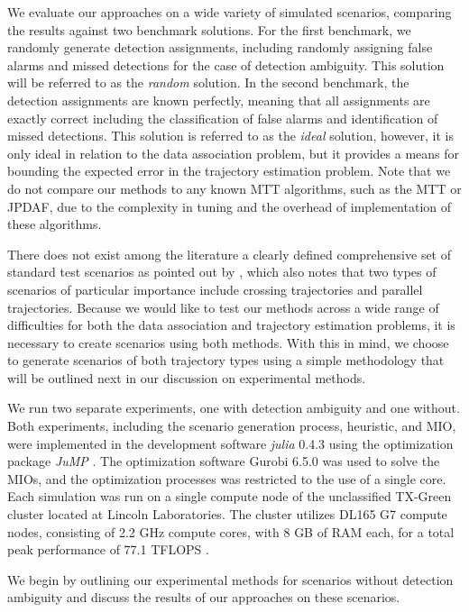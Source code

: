 We evaluate our approaches on a wide variety of simulated scenarios, comparing the results against two benchmark solutions. For the first benchmark, we randomly generate detection assignments, including randomly assigning false alarms and missed detections for the case of detection ambiguity. This solution will be referred to as the \textit{random} solution. In the second benchmark, the detection assignments are known perfectly, meaning that all assignments are exactly correct including the classification of false alarms and identification of missed detections. This solution is referred to as the \textit{ideal} solution, however, it is only ideal in relation to the data association problem, but it provides a means for bounding the expected error in the trajectory estimation problem. Note that we do not compare our methods to any known MTT algorithms, such as the MTT or JPDAF, due to the complexity in tuning and the overhead of implementation of these algorithms. 

There does not exist among the literature a clearly defined comprehensive set of standard test scenarios as pointed out by \cite{MTT-Taxonomy}, which also notes that two types of scenarios of particular importance include crossing trajectories and parallel trajectories. Because we would like to test our methods across a wide range of difficulties for both the data association and trajectory estimation problems, it is necessary to create scenarios using both methods. With this in mind, we choose to generate scenarios of both trajectory types using a simple methodology that will be outlined next in our discussion on experimental methods. 

We run two separate experiments, one with detection ambiguity and one without. Both experiments, including the scenario generation process, heuristic, and MIO, were implemented in the development software \textit{julia} 0.4.3 \cite{julia} using the optimization package \textit{JuMP} \cite{JuMP}. The optimization software Gurobi 6.5.0 \cite{gurobi} was used to solve the MIOs, and the optimization processes was restricted to the use of a single core. Each simulation was run on a single compute node of the unclassified TX-Green cluster located at Lincoln Laboratories. The cluster utilizes DL165 G7 compute nodes, consisting of 2.2 GHz compute cores, with 8 GB of RAM each, for a total peak performance of 77.1 TFLOPS \cite{LLGrid}. 

We begin by outlining our experimental methods for scenarios without detection ambiguity and discuss the results of our approaches on these scenarios. 

